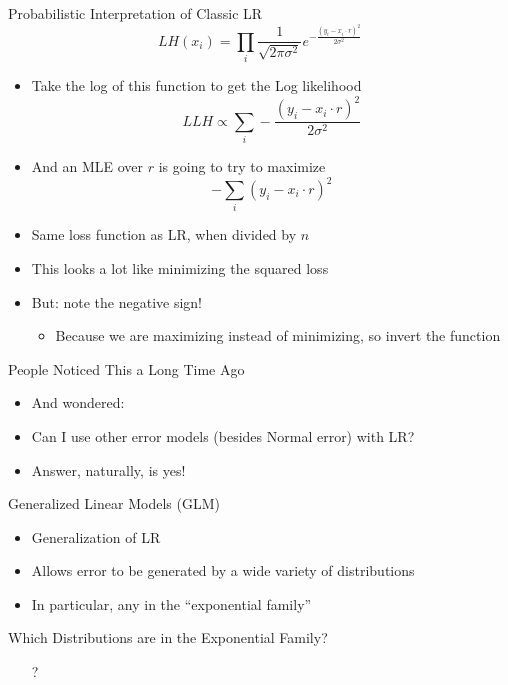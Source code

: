 \documentclass[aspectratio=169]{beamer}
\begin{document}
\begin{frame}{Probabilistic Interpretation of Classic LR}
	$$LH(x_i) = \prod_i \frac{1}{\sqrt{2\pi\sigma^2}} 
                e^{-\frac{(y_i - x_i \cdot r)^2}{2\sigma^2}}$$

	\begin{itemize}
	\item Take the log of this function to get the Log likelihood  
	$$LLH \propto \sum_i -\frac{(y_i - x_i \cdot r)^2}{2\sigma^{2}}$$
	\item And an MLE over $r$ is going to try to maximize
	$$  -\sum_i (y_i - x_i \cdot r)^2$$
	\item Same loss function as LR, when divided by $n$
	\item This looks a lot like minimizing the squared loss
	\item But: note the negative sign!
	\begin{itemize}
		\item Because we are maximizing instead of minimizing, so invert the function
	\end{itemize}
	\end{itemize}
\end{frame}
\begin{frame}{People Noticed This a Long Time Ago}

\begin{itemize}
\item And wondered:
\item Can I use other error models (besides Normal error) with LR?
\item Answer, naturally, is yes!
\end{itemize}
\end{frame}
\begin{frame}{Generalized Linear Models (GLM)}

\begin{itemize}
\item Generalization of LR
\item Allows error to be generated by a wide variety of distributions
\item In particular, any in the ``exponential family''
\end{itemize}
\end{frame}
\begin{frame}{Which Distributions are in the Exponential Family?}

\begin{itemize}
\item[?]
\end{itemize}
\end{frame}
\end{document}
